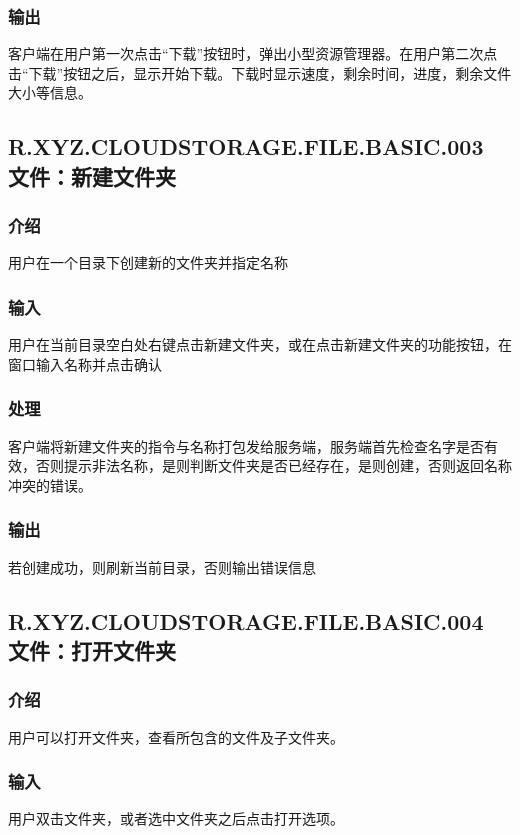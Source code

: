 \subsubsection{输出}
客户端在用户第一次点击“下载”按钮时，弹出小型资源管理器。在用户第二次点击“下载”按钮之后，显示开始下载。下载时显示速度，剩余时间，进度，剩余文件大小等信息。




\subsection{R.XYZ.CLOUDSTORAGE.FILE.BASIC.003 文件：新建文件夹}

\subsubsection{介绍}
用户在一个目录下创建新的文件夹并指定名称

\subsubsection{输入} 
用户在当前目录空白处右键点击新建文件夹，或在点击新建文件夹的功能按钮，在窗口输入名称并点击确认

\subsubsection{处理} 
客户端将新建文件夹的指令与名称打包发给服务端，服务端首先检查名字是否有效，否则提示非法名称，是则判断文件夹是否已经存在，是则创建，否则返回名称冲突的错误。

\subsubsection{输出} 
若创建成功，则刷新当前目录，否则输出错误信息



\subsection{R.XYZ.CLOUDSTORAGE.FILE.BASIC.004 文件：打开文件夹}

\subsubsection{介绍}
用户可以打开文件夹，查看所包含的文件及子文件夹。

\subsubsection{输入}
用户双击文件夹，或者选中文件夹之后点击打开选项。

